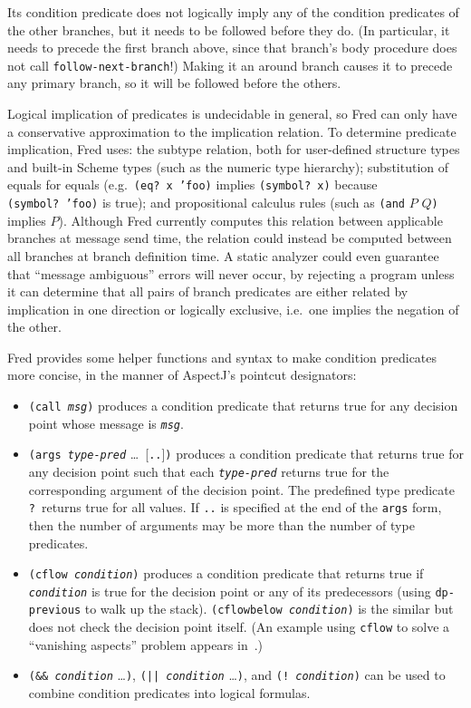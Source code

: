 \documentclass{article}
\newcommand{\code}[1]{\texttt{#1}}
\newcommand{\parm}[1]{\code{\textit{#1}}}
\begin{document}
Its condition predicate does not logically imply any of the condition
predicates of the other branches, but it needs to be followed before
they do.  (In particular, it needs to precede the first branch above,
since that branch's body procedure does not call
\code{follow-next-branch}!)  Making it an around branch causes it to
precede any primary branch, so it will be followed before the others.

Logical implication of predicates is undecidable in general, so Fred
can only have a conservative approximation to the implication
relation.  To determine predicate implication, Fred uses: the subtype
relation, both for user-defined structure types and built-in Scheme
types (such as the numeric type hierarchy); substitution of equals for
equals (e.g.~\code{(eq?\ x 'foo)} implies \code{(symbol?\ x)} because
\code{(symbol?\ 'foo)} is true); and propositional calculus rules (such
as \code{(and} $P$ $Q$\code{)} implies \code{$P$}).  Although Fred
currently computes this relation between applicable branches at
message send time, the relation could instead be computed between all
branches at branch definition time.  A static analyzer could even
guarantee that ``message ambiguous'' errors will never occur, by
rejecting a program unless it can determine that all pairs of branch
predicates are either related by implication in one direction or
logically exclusive, i.e.~one implies the negation of the other.

Fred provides some helper functions and syntax to make condition
predicates more concise, in the manner of AspectJ's pointcut
designators:

\begin{itemize}
\item \code{(call \parm{msg})} produces a condition predicate that
      returns true for any decision point whose message is \parm{msg}.
\item \code{(args \parm{type-pred}} \ldots\ [\code{..}]\code{)}
      produces a condition predicate that returns true for any
      decision point such that each \parm{type-pred} returns true for
      the corresponding argument of the decision point.  The
      predefined type predicate \code{?}\ returns true for all values.
      If \code{..} is specified at the end of the \code{args} form,
      then the number of arguments may be more than the number of type
      predicates.
\item \code{(cflow \parm{condition})} produces a condition predicate
      that returns true if \parm{condition} is true for the decision
      point or any of its predecessors (using \code{dp-previous} to
      walk up the stack).  \code{(cflowbelow \parm{condition})} is the
      similar but does not check the decision point itself.  (An
      example using \code{cflow} to solve a ``vanishing aspects''
      problem appears in~\cite{Fred}.)
\item \code{(\&\& \parm{condition}} \ldots\code{)},
      \code{(|| \parm{condition}} \ldots\code{)}, and
      \code{(!\ \parm{condition})} can be used to
      combine condition predicates into logical formulas.
\end{itemize}
\end{document}
